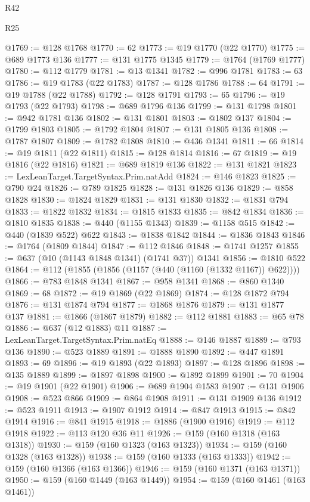 \begin{lexlean}{R42}
\begin{lexlean}{R25}
\begin{coremodule}
{{{{{{{{{{{{{{{{{{{{{{{{{{{{{{{{{{{{{{{{{{{{{{{{{{{{{{{{{{{{{{{{{{{{{{{{{{{{{{{{{{{{{{{{{{{{{{{{{{{{{{{{{{{{{{{{{{{{{{{{{{{{{{{{{{{{{{{{{{{{{{{{{{{{{{{{{{{{{{{{{{{{{{{{{{{{{{{{{{{{{{{{{{{{{{{{{{{{{{{@1769 := @128 @1768
@1770 := 62
@1773 := @19 @1770 (@22 @1770)
@1775 := @689 @1773 @136
@1777 := @131 @1775 @1345
@1779 := @1764 (@1769 @1777)
@1780 := @112 @1779
@1781 := @13 @1341
@1782 := @996 @1781
@1783 := 63
@1786 := @19 @1783 (@22 @1783)
@1787 := @128 @1786
@1788 := 64
@1791 := @19 @1788 (@22 @1788)
@1792 := @128 @1791
@1793 := 65
@1796 := @19 @1793 (@22 @1793)
@1798 := @689 @1796 @136
@1799 := @131 @1798
@1801 := @942 @1781 @136
@1802 := @131 @1801
@1803 := @1802 @137
@1804 := @1799 @1803
@1805 := @1792 @1804
@1807 := @131 @1805 @136
@1808 := @1787 @1807
@1809 := @1782 @1808
@1810 := @436 @1341
@1811 := 66
@1814 := @19 @1811 (@22 @1811)
@1815 := @128 @1814
@1816 := 67
@1819 := @19 @1816 (@22 @1816)
@1821 := @689 @1819 @136
@1822 := @131 @1821
@1823 := LexLeanTarget.TargetSyntax.Prim.natAdd
@1824 := @146 @1823
@1825 := @790 @24
@1826 := @789 @1825
@1828 := @131 @1826 @136
@1829 := @858 @1828
@1830 := @1824 @1829
@1831 := @131 @1830
@1832 := @1831 @794
@1833 := @1822 @1832
@1834 := @1815 @1833
@1835 := @842 @1834
@1836 := @1810 @1835
@1838 := @440 (@1155 @1343)
@1839 := @1158 @515
@1842 := @440 (@1839 @522) @622
@1843 := @1838 @1842
@1844 := @1836 @1843
@1846 := @1764 (@1809 @1844)
@1847 := @112 @1846
@1848 := @1741 @1257
@1855 := @637 (@10 (@1143 @1848 @1341) (@1741 @37)) @1341
@1856 := @1810 @522
@1864 := @112 (@1855 (@1856 (@1157 (@440 (@1160 (@1332 @1167)) @622))))
@1866 := @783 @1848 @1341
@1867 := @958 @1341
@1868 := @860 @1340
@1869 := 68
@1872 := @19 @1869 (@22 @1869)
@1874 := @128 @1872 @794
@1876 := @131 @1874 @794
@1877 := @1868 @1876
@1879 := @131 @1877 @137
@1881 := @1866 (@1867 @1879)
@1882 := @112 @1881
@1883 := @65 @78
@1886 := @637 (@12 @1883) @11
@1887 := LexLeanTarget.TargetSyntax.Prim.natEq
@1888 := @146 @1887
@1889 := @793 @136
@1890 := @523 @1889
@1891 := @1888 @1890
@1892 := @447 @1891
@1893 := 69
@1896 := @19 @1893 (@22 @1893)
@1897 := @128 @1896
@1898 := @135 @1889
@1899 := @1897 @1898
@1900 := @1892 @1899
@1901 := 70
@1904 := @19 @1901 (@22 @1901)
@1906 := @689 @1904 @1583
@1907 := @131 @1906
@1908 := @523 @866
@1909 := @864 @1908
@1911 := @131 @1909 @136
@1912 := @523 @1911
@1913 := @1907 @1912
@1914 := @847 @1913
@1915 := @842 @1914
@1916 := @841 @1915
@1918 := @1886 (@1900 @1916)
@1919 := @112 @1918
@1922 := @113 @120 @36 @11
@1926 := @159 (@160 @1318 (@163 @1318))
@1930 := @159 (@160 @1323 (@163 @1323))
@1934 := @159 (@160 @1328 (@163 @1328))
@1938 := @159 (@160 @1333 (@163 @1333))
@1942 := @159 (@160 @1366 (@163 @1366))
@1946 := @159 (@160 @1371 (@163 @1371))
@1950 := @159 (@160 @1449 (@163 @1449))
@1954 := @159 (@160 @1461 (@163 @1461))
}}}}}}}}}}}}}}}}}}}}}}}}}}}}}}}}}}}}}}}}}}}}}}}}}}}}}}}}}}}}}}}}}}}}}}}}}}}}}}}}}}}}}}}}}}}}}}}}}}}}}}}}}}}}}}}}}}}}}}}}}}}}}}}}}}}}}}}}}}}}}}}}}}}}}}}}}}}}}}}}}}}}}}}}}}}}}}}}}}}}}}}}}}}}}}}}}}}}}}}
\end{coremodule}
\end{lexlean}
\end{lexlean}

